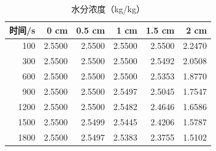 \begin{table}[htbp]
\centering
\caption{水分浓度（kg/kg）}
\label{tab:q1-2}
\begin{tabular}{rrrrrr}
\hline
时间/s & 0 cm & 0.5 cm & 1 cm & 1.5 cm & 2 cm \\
\hline
100 & 2.5500 & 2.5500 & 2.5500 & 2.5500 & 2.2470 \\
300 & 2.5500 & 2.5500 & 2.5500 & 2.5492 & 2.0508 \\
600 & 2.5500 & 2.5500 & 2.5500 & 2.5353 & 1.8770 \\
900 & 2.5500 & 2.5500 & 2.5497 & 2.5045 & 1.7547 \\
1200 & 2.5500 & 2.5500 & 2.5482 & 2.4646 & 1.6586 \\
1500 & 2.5500 & 2.5499 & 2.5445 & 2.4206 & 1.5787 \\
1800 & 2.5500 & 2.5497 & 2.5383 & 2.3755 & 1.5102 \\
\hline
\end{tabular}
\end{table}
